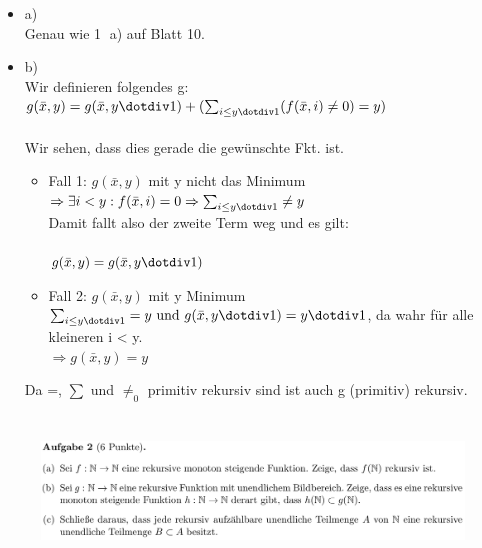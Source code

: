 \documentclass[a4paper]{scrartcl}%
\begin{document}
    \begin{itemize}
        \item a)\\
            Genau wie \textcircled{1} a) auf Blatt 10. 
        \item b)\\
            Wir definieren folgendes g:\\
            $g(\bar{x}, y) =\\
            g(\bar{x}, y \dotdiv 1) + (\sum_{i \leq y \dotdiv 1}(f(\bar{x}, i) \neq 0) = y)$\\
            \\
            Wir sehen, dass dies gerade die gewünschte Fkt. ist.\\
            \begin{itemize}
                \item Fall 1: $g(\bar{x},y)$ mit y nicht das Minimum\\
                    $\Rightarrow \exists i<y: f(\bar{x}, i) = 0 \Rightarrow \sum_{i \leq y \dotdiv 1} \neq y$\\
                    Damit fallt also der zweite Term weg und es gilt:\\
                    \\$g(\bar{x},y) = g(\bar{x},y\dotdiv 1)$\\
                \item Fall 2: $g(\bar{x}, y)$ mit y Minimum\\
                    $\sum_{i \leq y \dotdiv 1} = y \text{ und } g(\bar{x},y\dotdiv 1) = y \dotdiv 1$, da wahr für alle kleineren i < y.\\
                    $\Rightarrow g(\bar{x},y) = y$\\
            \end{itemize}
            Da =, $\sum$ und $\neq_0$ primitiv rekursiv sind ist auch g (primitiv) rekursiv.\\
    \end{itemize}%


\section*{}%
\label{sec:aufgabe_2}

    \begin{figure}[H]
        \includegraphics[scale=0.3]{./A-2.png}
        \label{fig:}
    \end{figure}
\end{document}
